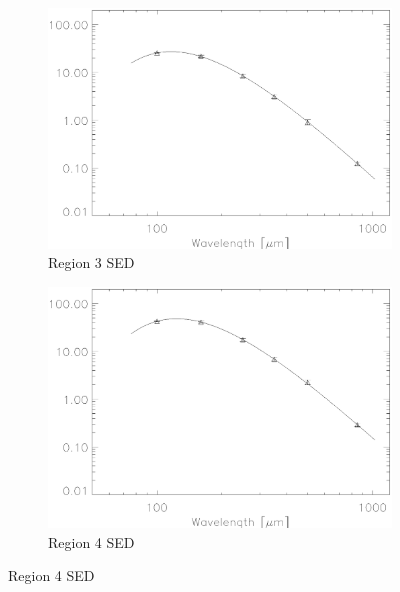 \begin{figure}
  \begin{subfigure}[t]{.48\textwidth}
    \centering
    \includegraphics[width=1.\linewidth]{sed_imgs/region_3beta_235_SED_fit.eps}
    \caption{Region 3 SED}
  \end{subfigure}
  \quad
  \begin{subfigure}[t]{.48\textwidth}
    \centering
    \includegraphics[width=1.\textwidth]{sed_imgs/region_4beta_23_SED_fit.eps}
    \caption{Region 4 SED}
  \end{subfigure}
  

\end{figure}

